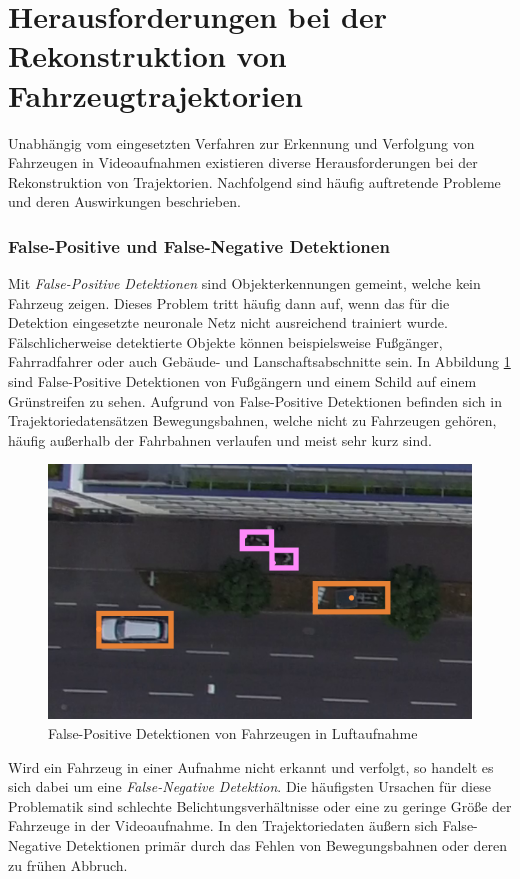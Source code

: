 \section{Herausforderungen bei der Rekonstruktion von Fahrzeugtrajektorien}
\label{sec:grund_challenges_reconstruction}

Unabhängig vom eingesetzten Verfahren zur Erkennung und Verfolgung von Fahrzeugen in Videoaufnahmen
existieren diverse Herausforderungen bei der Rekonstruktion von Trajektorien. Nachfolgend sind
häufig auftretende Probleme und deren Auswirkungen beschrieben.

\subsubsection*{False-Positive und False-Negative Detektionen}
Mit \textit{False-Positive Detektionen} sind Objekterkennungen gemeint, welche kein Fahrzeug zeigen.
Dieses Problem tritt häufig dann auf, wenn das für die Detektion eingesetzte neuronale Netz nicht ausreichend trainiert wurde.
Fälschlicherweise detektierte Objekte können beispielsweise Fußgänger, Fahrradfahrer oder auch Gebäude- und Lanschaftsabschnitte sein.
In Abbildung \ref{fig:grund_false_positive_detections} sind False-Positive Detektionen von Fußgängern
und einem Schild auf einem Grünstreifen zu sehen.
Aufgrund von False-Positive Detektionen befinden sich in Trajektoriedatensätzen Bewegungsbahnen, welche nicht zu
Fahrzeugen gehören, häufig außerhalb der Fahrbahnen verlaufen und meist sehr kurz sind.

\begin{figure}[H]
    \centering
    \includegraphics[width=0.45\linewidth]{resources/img/grundlagen/TrajectoryReconstruction/challenges/False-Positives}
    \caption[False-Positive Detektionen]{False-Positive Detektionen von Fahrzeugen in Luftaufnahme}
    \label{fig:grund_false_positive_detections}
\end{figure}

Wird ein Fahrzeug in einer Aufnahme nicht erkannt und verfolgt, so handelt es sich dabei um eine
\textit{False-Negative Detektion}.
Die häufigsten Ursachen für diese Problematik sind schlechte Belichtungsverhältnisse oder eine zu geringe
Größe der Fahrzeuge in der Videoaufnahme.
In den Trajektoriedaten äußern sich False-Negative Detektionen primär durch das Fehlen von Bewegungsbahnen
oder deren zu frühen Abbruch.

